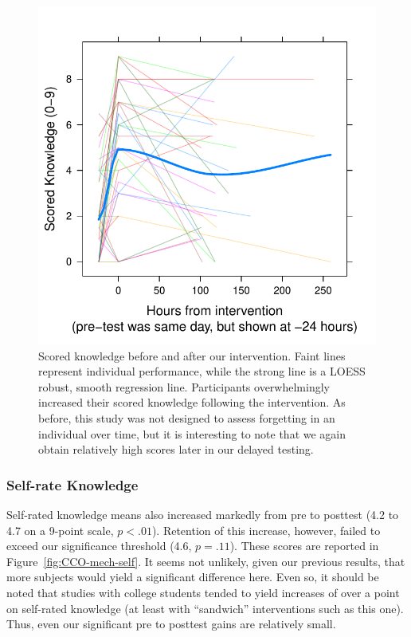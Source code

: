 \begin{figure}
    \centering
    \includegraphics{CCO-mech-scored.pdf}
    \caption{Scored knowledge before and after our intervention. Faint lines
        represent individual performance, while the strong line is a LOESS
        robust, smooth regression line. Participants overwhelmingly increased
        their scored knowledge following the intervention. As before, this study was
        not designed to assess forgetting in an individual over time, but it is
        interesting to note that we again obtain relatively high scores later in
        our delayed testing.}
    \label{fig:CCO-mech-scored}
\end{figure}

\subsubsection{Self-rate Knowledge}

Self-rated knowledge means also increased markedly from pre to posttest (4.2
to 4.7 on a 9-point scale, $p<.01$). Retention of this increase, however,
failed to exceed our significance threshold (4.6, $p=.11$). These scores are
reported in Figure~\ref{fig:CCO-mech-self}. It seems not unlikely, given our
previous results, that more subjects would yield a significant difference here.
Even so, it should be noted that studies with college students tended to yield
increases of over a point on self-rated knowledge (at least with “sandwich”
interventions such as this one). Thus, even our significant pre to posttest
gains are relatively small.

